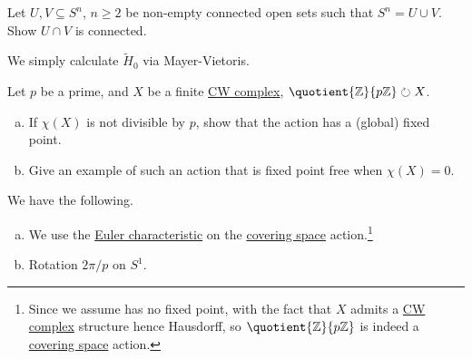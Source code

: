 \begin{exercise}[QR Jan. 2016]
	Let \(U, V\subseteq S^n\), \(n \geq 2\) be non-empty connected open sets such that \(S^n = U \cup V\). Show \(U \cap V\) is connected.
\end{exercise}
\begin{answer}
	We simply calculate \(\widetilde{H} _0\) via Mayer-Vietoris.
\end{answer}

\begin{exercise}[QR Jan. 2016]
	Let \(p\) be a prime, and \(X\) be a finite \hyperref[def:CW-Complex]{CW complex}, \(\quotient{\mathbb{Z} }{p \mathbb{Z} }\circlearrowright X \).

	\begin{enumerate}[(a)]
		\item If \(\chi (X)\) is not divisible by \(p\), show that the action has a (global) fixed point.
		\item Give an example of such an action that is fixed point free when \(\chi (X) = 0\).
	\end{enumerate}
\end{exercise}
\begin{answer}
	We have the following.
	\begin{enumerate}[(a)]
		\item We use the \hyperref[def:Euler-characteristic]{Euler characteristic} on the \hyperref[def:covering-space]{covering space} action.\footnote{Since we assume has no fixed point, with the fact that \(X\) admits a \hyperref[def:CW-Complex]{CW complex} structure hence Hausdorff, so \(\quotient{\mathbb{Z} }{p\mathbb{Z} } \) is indeed a \hyperref[def:covering-space]{covering space} action.}
		\item Rotation \(2\pi / p\) on \(S^1\).
	\end{enumerate}
\end{answer}